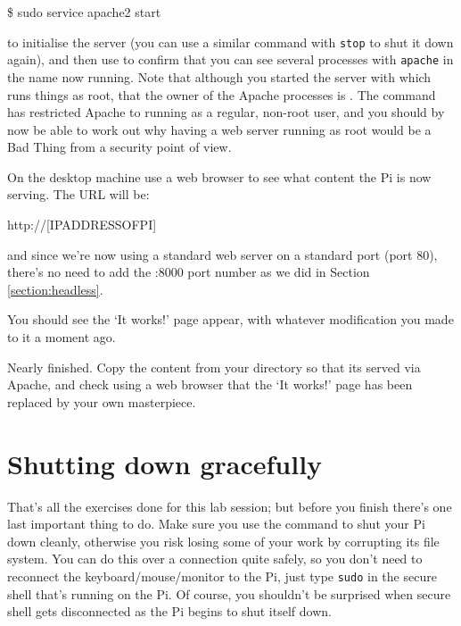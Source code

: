 \begin{ttoutenv}
\$ sudo service apache2 start
\end{ttoutenv}

to initialise the server (you can use a similar command with
\texttt{stop} to shut it down again), and then use 
to confirm that you can see several processes with \texttt{apache} in
the name now running. Note that although you started the server with
 which runs things as root, that the owner of the
Apache processes is . The  command has restricted Apache to running as a regular,
non-root user, and you should by now be able to work out why having a
web server running as root would be a Bad Thing from a security point
of view.

On the desktop machine use a web browser to see what content the Pi is
now serving. The URL will be:

\begin{ttoutenv}
http://[IPADDRESSOFPI]
\end{ttoutenv}

and since we're now using a standard web server on a standard port
(port 80), there's no need to add the :8000 port number as we did in
Section \ref{section:headless}.

You should see the `It works!' page appear, with whatever modification
you made to it a moment ago.

Nearly finished. Copy the content from your 
directory so that its served via Apache, and check using a web browser
that the `It works!' page has been replaced by your own masterpiece.

\section{Shutting down gracefully}

That's all the exercises done for this lab session; but before you
finish there's one last important thing to do. Make sure you use the
 command to shut your Pi down cleanly, otherwise you
risk losing some of your work by corrupting its file system. You can
do this over a  connection quite safely, so you don't
need to reconnect the keyboard/mouse/monitor to the Pi, just type
\texttt{sudo}  in the secure shell that's running on
the Pi. Of course, you shouldn't be surprised when secure shell gets
disconnected as the Pi begins to shut itself down.

